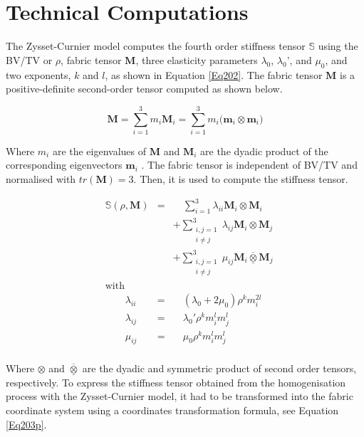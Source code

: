 \documentclass[a4paper,fleqn]{DC_ArtStyle}
\begin{document}
	\appendix
	\section{Technical Computations}\label{A0}
	
	The Zysset-Curnier model \cite{Zysset1995} computes the fourth order stiffness tensor $\mathbb{S}$ using the BV/TV or $\rho$, fabric tensor $\mathbf{M}$, three elasticity parameters $\lambda_0$, $\lambda_0$', and $\mu_0$, and two exponents, $k$ and $l$, as shown in Equation \ref{Eq202}. The fabric tensor $\mathbf{M}$ is a positive-definite second-order tensor computed as shown below.
	
	\begin{equation}
	\mathbf{M} = \sum_{i=1}^{3}{m_i \mathbf{M}_i} = \sum_{i=1}^{3}{m_i (\mathbf{m}_i \otimes \mathbf{m}_i})
	\label{Eq201}
	\end{equation}
	
	Where $m_i$ are the eigenvalues of $\mathbf{M}$ and $\mathbf{M}_i$ are the dyadic product of the corresponding eigenvectors $\mathbf{m}_i$ \cite{Cowin1985,Harrigan1985}. The fabric tensor is independent of BV/TV and normalised with $tr(\mathbf{M}) = 3$. Then, it is used to compute the stiffness tensor.
	
	\begin{equation}
	\begin{split}
	&\mathbb{S}(\rho,\mathbf{M}) &=& \quad\sum_{i=1}^{3} \lambda_{ii} \mathbf{M}_i \otimes \mathbf{M}_i \\ &&&+ \sum_{\substack{i,j=1\\i \neq j}}^{3} \lambda_{ij} \mathbf{M}_i \otimes \mathbf{M}_j \\ &&&+ \sum_{\substack{i,j=1\\i \neq j}}^{3} \mu_{ij} \mathbf{M}_i \overline{\underline{\otimes}} \mathbf{M}_j \\
	&\text{with} &\\
	&\qquad\lambda_{ii} &=& \quad(\lambda_0 + 2\mu_0)\rho^k m_i^{2l} \\
	&\qquad\lambda_{ij} &=& \quad\lambda_0' \rho^k m_i^{l} m_j^{l} \\
	&\qquad\mu_{ij} &=& \quad\mu_0 \rho^k m_i^{l} m_j^{l} \\
	\end{split}
	\label{Eq202}
	\end{equation}
	
	Where $\otimes$ and $\overline{\underline{\otimes}}$ are the dyadic and symmetric product of second order tensors, respectively. To express the stiffness tensor obtained from the homogenisation process with the Zysset-Curnier model, it had to be transformed into the fabric coordinate system using a coordinates transformation formula, see Equation \ref{Eq203p}.
	
\end{document}
